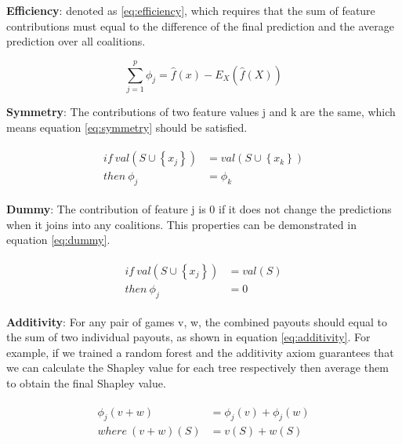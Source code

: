 \textbf{Efficiency}: denoted as \ref*{eq:efficiency}, which requires that the sum of feature contributions must equal to the difference of the final prediction and the average prediction over all coalitions. 

\begin{equation} \label{eq:efficiency}
\sum_{j=1}^{p} \phi_{j}=\hat{f}(x)-E_{X}(\hat{f}(X))
\end{equation}

\textbf{Symmetry}: The contributions of two feature values j and k are the same, which means equation \ref{eq:symmetry} should be satisfied. 

\begin{equation} \label{eq:symmetry}
\begin{gathered}
\begin{aligned}
if \ val\left(S \cup\left\{x_{j}\right\}\right) &= val\left(S \cup\left\{x_{k}\right\}\right) \\
then \  \phi_{j} &= \phi_{k}
\end{aligned}
\end{gathered}
\end{equation}

\textbf{Dummy}: The contribution of feature j is 0 if it does not change the predictions when it joins into any coalitions. This properties can be demonstrated in equation \ref{eq:dummy}.

\begin{equation} \label{eq:dummy}
\begin{gathered}
\begin{aligned}
if \ val\left(S \cup\left\{x_{j}\right\}\right) &= val\left(S \right) \\
then \  \phi_{j} &= 0
\end{aligned}
\end{gathered}
\end{equation}

\textbf{Additivity}: For any pair of games v, w, the combined payouts should equal to the sum of two individual payouts, as shown in equation \ref{eq:additivity}. For example, if we trained a random forest and the additivity axiom guarantees that we can calculate the Shapley value for each tree respectively then average them to obtain the final Shapley value. 

\begin{equation} \label{eq:additivity}
\begin{gathered}
\begin{aligned}
\phi_{j}(v+w) &= \phi_{j}(v) + \phi_{j}(w) \\
where \ (v+w)(S) &= v(S) + w(S)
\end{aligned}
\end{gathered}
\end{equation}

